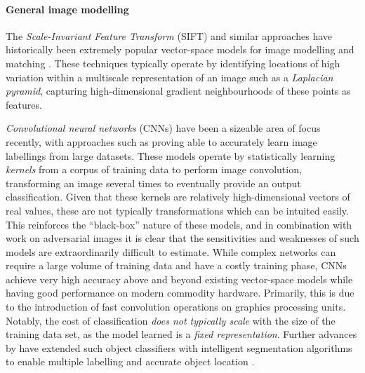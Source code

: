 \documentclass{mpaper}
\begin{document}
\paragraph{General image modelling}
The \emph{Scale-Invariant Feature Transform} (SIFT) and similar approaches have historically been extremely popular vector-space models for image modelling and matching \cite{SIFT,Sift-Variants-Comparison}.
These techniques typically operate by identifying locations of high variation within a multiscale representation of an image such as a \emph{Laplacian pyramid}, capturing high-dimensional gradient neighbourhoods of these points as features.

\emph{Convolutional neural networks} (CNNs) have been a sizeable area of focus recently, with approaches such as \citeauthor{ConvNet} \cite{ConvNet} proving able to accurately learn image labellings from large datasets.
These models operate by statistically learning \emph{kernels} from a corpus of training data to perform image convolution, transforming an image several times to eventually provide an output classification.
Given that these kernels are relatively high-dimensional vectors of real values, these are not typically transformations which can be intuited easily.
This reinforces the ``black-box'' nature of these models, and in combination with work on adversarial images \cite{AdversarialML} it is clear that the sensitivities and weaknesses of such models are extraordinarily difficult to estimate.
While complex networks can require a large volume of training data and have a costly training phase, CNNs achieve very high accuracy above and beyond existing vector-space models while having good performance on modern commodity hardware.
Primarily, this is due to the introduction of fast convolution operations on graphics processing units.
Notably, the cost of classification \emph{does not typically scale} with the size of the training data set, as the model learned is a \emph{fixed representation}.
Further advances by \citeauthor{MultilabelCNN} have extended such object classifiers with intelligent segmentation algorithms \cite{BING} to enable multiple labelling and accurate object location \cite{MultilabelCNN}.
\end{document}
